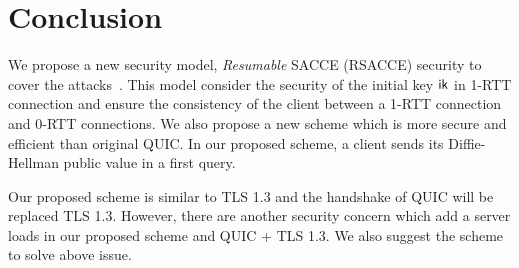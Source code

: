 \section{Conclusion} \label{sec:conclusion}

We propose a new security model, \textit{Resumable} SACCE (RSACCE) security
to cover the attacks~\cite{LJBN15:QUIC}.
This model consider the security of the initial key $\mathsf{ik}$ in 1-RTT connection
and ensure the consistency of the client between a 1-RTT connection and 0-RTT
connections.
We also propose a new scheme which is more secure and efficient than original QUIC.
In our proposed scheme, a client sends its Diffie-Hellman public value in a
first query.

Our proposed scheme is similar to TLS 1.3 and the handshake of QUIC will be replaced
TLS 1.3. However, there are another security concern which add a server loads in our
proposed scheme and QUIC + TLS 1.3.
We also suggest the scheme to solve above issue.